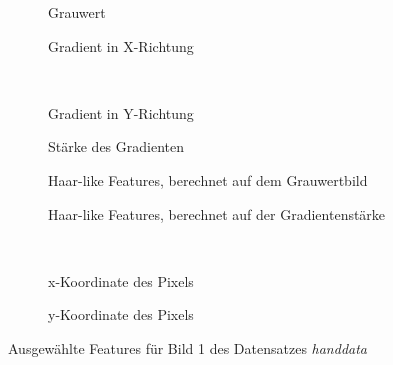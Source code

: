 \documentclass[]{report}
\newlength\figureheight
\newlength\figurewidth
\begin{document}
\begin{enumerate}
						\setlength\figureheight{3.5cm}
						\setlength{}
						\begin{figure}
							\begin{subfigure}{0.45\textwidth}
								\centering
								
								\caption{Grauwert}
								\label{fig:g}
							\end{subfigure}
							\qquad
							\begin{subfigure}{0.45\textwidth}
								\centering
								
								\caption{Gradient in X-Richtung}
								\label{fig:gradx}
							\end{subfigure}	
							\\
							\begin{subfigure}{0.45\textwidth}
								\centering
								
								\caption{Gradient in Y-Richtung}
								\label{fig:grady}
							\end{subfigure}
							\qquad
							\begin{subfigure}{0.45\textwidth}
								\centering
								
								\caption{Stärke des Gradienten}
								\label{fig:m}
							\end{subfigure}	
								\begin{subfigure}{0.45\textwidth}
									\centering
									
									\caption{Haar-like Features, berechnet auf dem Grauwertbild}
									\label{fig:hgrey}
								\end{subfigure}
								\qquad
								\begin{subfigure}{0.45\textwidth}
									\centering
									
									\caption{Haar-like Features, berechnet auf der Gradientenstärke}
									\label{fig:hgrad}
								\end{subfigure}	
								\\
								\begin{subfigure}{0.45\textwidth}
									\centering
									
									\caption{x-Koordinate des Pixels}
									\label{fig:x}
								\end{subfigure}
								\qquad
								\begin{subfigure}{0.45\textwidth}
									\centering
									
									\caption{y-Koordinate des Pixels}
									\label{fig:y}
								\end{subfigure}	
							\caption{Ausgewählte Features für Bild 1 des Datensatzes \textit{handdata}}
							\label{fig:featurePlot}
						\end{figure}
						

\end{enumerate}
\end{document}

